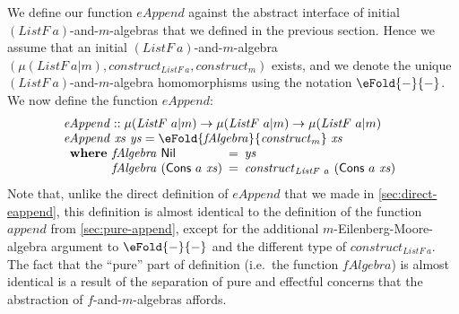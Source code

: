 We define our function $\mathit{eAppend}$ against the abstract
interface of initial $(\mathit{ListF}~a)$-and-$m$-algebras that we
defined in the previous section. Hence we assume that an initial
$(\mathit{ListF}~a)$-and-$m$-algebra $(\mu(\mathit{ListF}~a|m),
\mathit{construct}_{\mathit{ListF}~a}, \mathit{construct}_m)$ exists,
and we denote the unique $(\mathit{ListF}~a)$-and-$m$-algebra
homomorphisms using the notation $\eFold{-}{-}$. We now define the
function $\mathit{eAppend}$:
\begin{displaymath}
  \begin{array}{l}
    \mathit{eAppend} :: \mu(\mathit{ListF}~a|m) \to \mu(\mathit{ListF}~a|m) \to \mu(\mathit{ListF}~a|m) \\
    \mathit{eAppend}~\mathit{xs}~\mathit{ys} = \eFold{\mathit{fAlgebra}}{\mathit{construct}_m}~\mathit{xs} \\
    \begin{array}{r@{\hspace{0.4em}}l@{\hspace{0.5em}}c@{\hspace{0.5em}}l}
      \textbf{where} & \mathit{fAlgebra}~\mathsf{Nil} &=& \mathit{ys} \\
                     & \mathit{fAlgebra}~(\mathsf{Cons}~a~\mathit{xs}) &=& \mathit{construct}_{\mathit{ListF}~a}~(\mathsf{Cons}~a~\mathit{xs})      
    \end{array}
  \end{array}
\end{displaymath}
Note that, unlike the direct definition of $\mathit{eAppend}$ that we
made in \autoref{sec:direct-eappend}, this definition is almost
identical to the definition of the function $\mathit{append}$ from
\autoref{sec:pure-append}, except for the additional
$m$-Eilenberg-Moore-algebra argument to $\eFold{-}{-}$ and the
different type of $\mathit{construct}_{\mathit{ListF}~a}$. The fact
that the ``pure'' part of definition (i.e.~the function
$\mathit{fAlgebra}$) is almost identical is a result of the separation
of pure and effectful concerns that the abstraction of
$f$-and-$m$-algebras affords.

